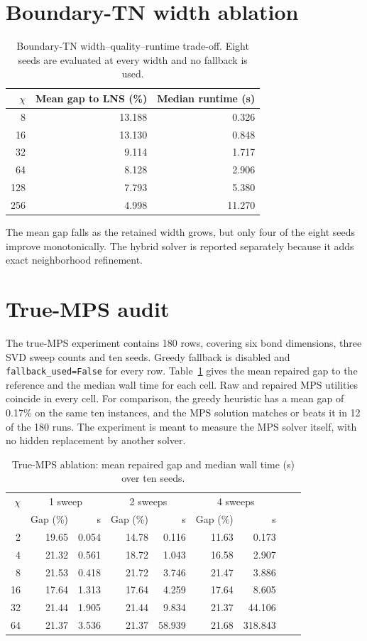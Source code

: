 \documentclass[pdflatex,sn-nature]{sn-jnl}
\begin{document}
\section{Boundary-TN width ablation}
\begin{table}[h]
\caption{Boundary-TN width--quality--runtime trade-off. Eight seeds are evaluated at every width and no fallback is used.}\centering\small
\begin{tabular}{@{}rrr@{}}
\toprule
$\chi$ & Mean gap to LNS (\%) & Median runtime (s)\\
\midrule
8 & 13.188 & 0.326\\
16 & 13.130 & 0.848\\
32 & 9.114 & 1.717\\
64 & 8.128 & 2.906\\
128 & 7.793 & 5.380\\
256 & 4.998 & 11.270\\
\bottomrule
\end{tabular}
\end{table}
The mean gap falls as the retained width grows, but only four of the eight seeds improve monotonically. The hybrid solver is reported separately because it adds exact neighborhood refinement.

\section{True-MPS audit}
The true-MPS experiment contains 180 rows, covering six bond dimensions, three SVD sweep counts and ten seeds. Greedy fallback is disabled and \texttt{fallback\_used=False} for every row. Table~\ref{tab:mps} gives the mean repaired gap to the reference and the median wall time for each cell. Raw and repaired MPS utilities coincide in every cell. For comparison, the greedy heuristic has a mean gap of 0.17\% on the same ten instances, and the MPS solution matches or beats it in 12 of the 180 runs. The experiment is meant to measure the MPS solver itself, with no hidden replacement by another solver.

\begin{table}[h]
\caption{True-MPS ablation: mean repaired gap and median wall time (s) over ten seeds.}\label{tab:mps}\centering\small
\begin{tabular}{@{}rrrrrrrrr@{}}
\toprule
$\chi$ & \multicolumn{2}{c}{1 sweep} & \multicolumn{2}{c}{2 sweeps} & \multicolumn{2}{c}{4 sweeps}\\
 & Gap (\%) & s & Gap (\%) & s & Gap (\%) & s\\
\midrule
2  & 19.65 & 0.054 & 14.78 & 0.116 & 11.63 & 0.173\\
4  & 21.32 & 0.561 & 18.72 & 1.043 & 16.58 & 2.907\\
8  & 21.53 & 0.418 & 21.72 & 3.746 & 21.47 & 3.886\\
16 & 17.64 & 1.313 & 17.64 & 4.259 & 17.64 & 8.605\\
32 & 21.44 & 1.905 & 21.44 & 9.834 & 21.37 & 44.106\\
64 & 21.37 & 3.536 & 21.37 & 58.939 & 21.68 & 318.843\\
\bottomrule
\end{tabular}
\end{table}
\end{document}
